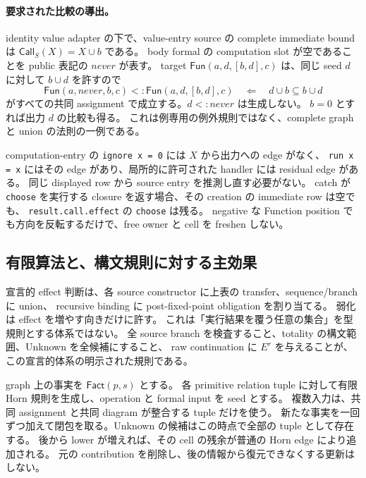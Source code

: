 \documentclass[11pt,a4paper]{article}
\theoremstyle{remark}
\begin{document}
\paragraph{要求された比較の導出。}
identity value adapter の下で、value-entry source の complete immediate bound は
$\mathsf{Call}_S(X)=X\cup b$ である。
body formal の computation slot が空であることを public 表記の $never$ が表す。
target $\mathsf{Fun}(a,d,[b,d],c)$ は、同じ seed $d$ に対して $b\cup d$ を許すので
\[
 \mathsf{Fun}(a,never,b,c)<:\mathsf{Fun}(a,d,[b,d],c)
 \quad\Longleftarrow\quad
 d\cup b\subseteq b\cup d
\]
がすべての共同 assignment で成立する。$d<:never$ は生成しない。
$b=0$ とすれば出力 $d$ の比較も得る。
これは例専用の例外規則ではなく、complete graph と union の法則の一例である。

computation-entry の \texttt{ignore x = 0} には $X$ から出力への edge がなく、
\texttt{run x = x} にはその edge があり、局所的に許可された handler には residual edge がある。
同じ displayed row から source entry を推測し直す必要がない。
catch が \texttt{choose} を実行する closure を返す場合、その creation の immediate row は空でも、
\texttt{result.call.effect} の \texttt{choose} は残る。
negative な Function position でも方向を反転するだけで、free owner と cell を freshen しない。

\subsection{有限算法と、構文規則に対する主効果}

宣言的 effect 判断は、各 source constructor に上表の transfer、sequence/branch に union、
recursive binding に post-fixed-point obligation を割り当てる。
弱化は effect を増やす向きだけに許す。
これは「実行結果を覆う任意の集合」を型規則とする体系ではない。
全 source branch を検査すること、totality の構文範囲、Unknown を全候補にすること、
raw continuation に $E^r$ を与えることが、この宣言的体系の明示された規則である。

graph 上の事実を $\mathsf{Fact}(p,s)$ とする。
各 primitive relation tuple に対して有限 Horn 規則を生成し、operation と formal input を seed とする。
複数入力は、共同 assignment と共同 diagram が整合する tuple だけを使う。
新たな事実を一回ずつ加えて閉包を取る。Unknown の候補はこの時点で全部の tuple として存在する。
後から lower が増えれば、その cell の残余が普通の Horn edge により追加される。
元の contribution を削除し、後の情報から復元できなくする更新はしない。
\end{document}
